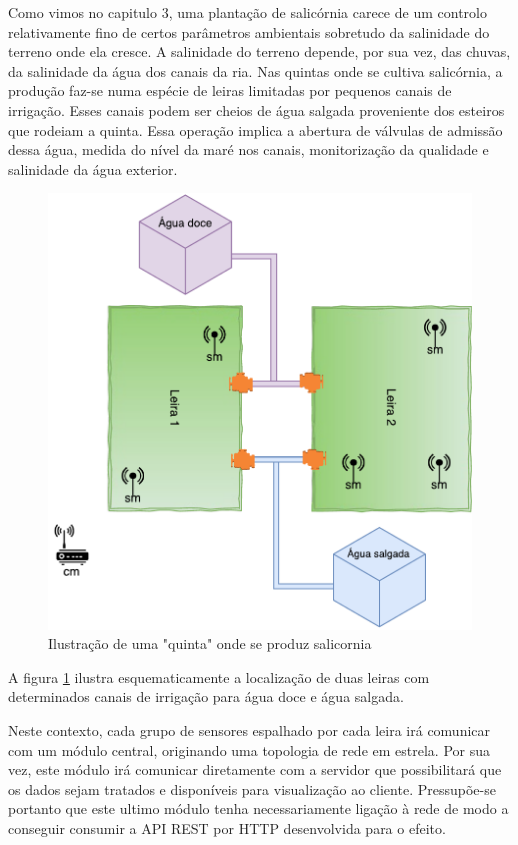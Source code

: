 Como vimos no capitulo 3, uma plantação de  salicórnia carece de um controlo relativamente fino de certos parâmetros ambientais sobretudo da salinidade do terreno onde ela cresce. A salinidade do terreno depende, por sua vez, das chuvas, da salinidade da água dos canais da ria. Nas quintas onde se cultiva salicórnia, a produção faz-se numa espécie de leiras limitadas por pequenos canais de irrigação. Esses canais podem ser cheios de água salgada proveniente dos esteiros que rodeiam a quinta. Essa operação implica a abertura de válvulas de admissão dessa água, medida do nível da maré nos canais, monitorização da qualidade e salinidade da água exterior.



\begin{figure}[!htb]
	\centering
	\includegraphics[scale=0.55]{esquemas/leiras-comm-geral.pdf}
	\caption{Ilustração de uma "quinta" onde se produz salicornia}
	\label{leira}
\end{figure}

A figura \ref{leira} ilustra esquematicamente a localização de duas leiras com determinados canais de irrigação para água doce e água salgada. 
 
 
Neste contexto, cada grupo de sensores espalhado por cada leira irá comunicar com um módulo central, originando uma topologia de rede em estrela.  Por sua vez, este módulo irá comunicar diretamente com a servidor que possibilitará que os dados sejam tratados e disponíveis para visualização ao cliente. Pressupõe-se portanto que este ultimo módulo tenha necessariamente ligação à rede de modo a conseguir consumir a API REST por HTTP desenvolvida para o efeito. 


